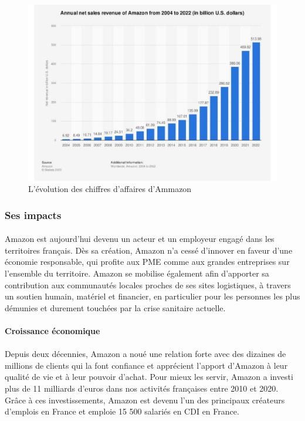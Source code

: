 \begin{figure}[htbp]
    \centering
    \includegraphics[width=0.8\linewidth]{./Graphismes-UTC/logos/Amazon/266282.pdf}\hfill
    \caption{L'évolution des chiffres d'affaires d'Ammazon \cite{revenue}} 
\end{figure}

\subsubsection{Ses impacts}
\paragraph{}
\vspace{-2em}  %
Amazon est aujourd'hui devenu un acteur et un employeur engagé dans les territoires français. Dès sa création, Amazon n'a cessé d'innover en faveur d'une économie responsable, qui profite aux PME comme aux grandes entreprises sur l'ensemble du territoire. Amazon se mobilise également afin d'apporter sa contribution aux communautés locales proches de ses sites logistiques, à travers un soutien humain, matériel et financier, en particulier pour les personnes les plus démunies et durement touchées par la crise sanitaire actuelle. \cite{aboutamazon}
\paragraph{}
\vspace{-2em}  %

{\large\textbf{Croissance économique}}
\paragraph{}
\vspace{-3em}  %
Depuis deux décennies, Amazon a noué une relation forte avec des dizaines de millions de clients qui la font confiance et apprécient l'apport d'Amazon à leur qualité de vie et à leur pouvoir d'achat. Pour mieux les servir, Amazon a investi plus de 11 milliards d'euros dans nos activités françaises entre 2010 et 2020. Grâce à ces investissements, Amazon est devenu l'un des principaux créateurs d'emplois en France et emploie 15 500 salariés en CDI en France.
